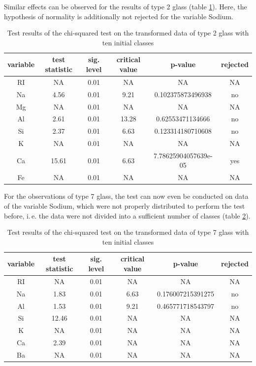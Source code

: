 \documentclass[a4paper, 12pt, titlepage, headsepline, listof = totoc, bibliography = totoc, numbers = noenddot]{scrartcl}
\newcommand{\ie}{i.\,e. }
\begin{document}
Similar effects can be observed for the results of type 2 glass (table \ref{tab:chi-type2-trans}). Here, the hypothesis of normality is additionally not rejected for the variable Sodium.

\begin{table}[h!]
\centering
\begin{tabular}{|cccccc|} \hline variable & test statistic & sig. level & critical value & p-value & rejected\\ \hline RI & NA & 0.01 & NA & NA & NA\\ 
Na & 4.56 & 0.01 & 9.21 & 0.102375873496938 & no\\ 
Mg & NA & 0.01 & NA & NA & NA\\ 
Al & 2.61 & 0.01 & 13.28 & 0.62553471134666 & no\\ 
Si & 2.37 & 0.01 & 6.63 & 0.123314180710608 & no\\ 
K & NA & 0.01 & NA & NA & NA\\ 
Ca & 15.61 & 0.01 & 6.63 & 7.78625904057639e-05 & yes\\ 
Fe & NA & 0.01 & NA & NA & NA\\ \hline \end{tabular}\caption{Test results of the chi-squared test on the transformed data of type 2 glass with ten initial classes}
\label{tab:chi-type2-trans}
\end{table}

For the observations of type 7 glass, the test can now even be conducted on data of the variable Sodium, which were not properly distributed to perform the test before, \ie the data were not divided into a sufficient number of classes (table \ref{tab:chi-type7-trans}).

\begin{table}[h!]
\centering
\begin{tabular}{|cccccc|} \hline variable & test statistic & sig. level & critical value & p-value & rejected\\ \hline RI & NA & 0.01 & NA & NA & NA\\ 
Na & 1.83 & 0.01 & 6.63 & 0.176007215391275 & no\\ 
Al & 1.53 & 0.01 & 9.21 & 0.465771718543797 & no\\ 
Si & 12.46 & 0.01 & NA & NA & NA\\ 
K & NA & 0.01 & NA & NA & NA\\ 
Ca & 2.39 & 0.01 & NA & NA & NA\\ 
Ba & NA & 0.01 & NA & NA & NA\\ \hline \end{tabular}\caption{Test results of the chi-squared test on the transformed data of type 7 glass with ten initial classes}
\label{tab:chi-type7-trans}
\end{table}
\end{document}
